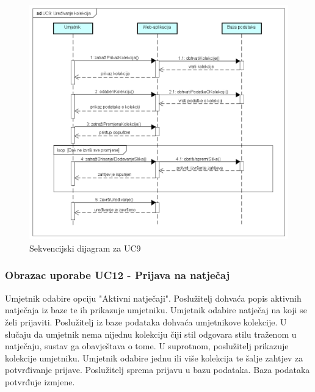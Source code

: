 			\begin{figure}[H]
		
				\includegraphics[width=\textwidth,height=\textheight,keepaspectratio]{sd_uc9}
				\caption{Sekvencijski dijagram za UC9}
				
			\end{figure}
		\eject
		
		\subsubsection{Obrazac uporabe UC12 - Prijava na natječaj}
		
		{Umjetnik odabire opciju "Aktivni natječaji". Poslužitelj dohvaća popis aktivnih natječaja iz baze te
			ih prikazuje umjetniku. Umjetnik odabire natječaj na koji se želi prijaviti. Poslužitelj iz baze podataka dohvaća umjetnikove kolekcije. U slučaju da umjetnik nema
			nijednu kolekciju čiji stil odgovara stilu traženom u natječaju, sustav ga obavještava o tome. 
			U suprotnom, poslužitelj prikazuje kolekcije umjetniku. Umjetnik odabire jednu ili više kolekcija
			te šalje zahtjev za potvrđivanje prijave. Poslužitelj sprema prijavu u bazu podataka. Baza podataka potvrđuje
			izmjene.}
		
